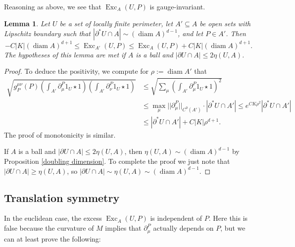 \documentclass[reqno,10pt]{amsart}
\DeclareMathOperator{\diam}{diam}
\DeclareMathOperator{\Exc}{Exc}
\newtheorem{lemma}[theorem]{Lemma}
\theoremstyle{definition}
\numberwithin{equation}{section}
\begin{document}
Reasoning as above, we see that $\Exc_A(U, P)$ is gauge-invariant.

\begin{lemma}
Let $U$ be a set of locally finite perimeter, let $A' \subseteq A$ be open sets with Lipschitz boundary such that $|\partial^* U \cap A| \sim (\diam A)^{d - 1}$,
and let $P \in A'$. Then
\begin{equation}\label{approximate monotone}
-C |K| (\diam A)^{d + 1} \leq \Exc_{A'}(U, P) \leq \Exc_A(U, P) + C |K|(\diam A)^{d + 1}.
\end{equation}
The hypotheses of this lemma are met if $A$ is a ball and $|\partial U \cap A| \leq 2\eta(U, A)$.
\end{lemma}
\begin{proof}
To deduce the positivity, we compute for $\rho := \diam A'$ that
\begin{align*}
\sqrt{g^{\mu\nu}_P(P) \left(\int_{A'} \partial^P_\mu 1_U \star 1\right) \left(\int_{A'} \partial^P_\nu 1_U \star 1\right)} &\leq \sqrt{\sum_\mu \left(\int_{A'} \partial_\mu^P 1_U \star 1\right)^2} \\
 & \leq \max_\mu ||\partial^P_\mu||_{C^0(A')} \cdot |\partial^* U \cap A'| \leq e^{CK\rho^2} |\partial^* U \cap A'| \\
 & \leq |\partial^* U \cap A'| + C|K|\rho^{d + 1}.
\end{align*}
The proof of monotonicity is similar.

If $A$ is a ball and $|\partial U \cap A| \leq 2\eta(U, A)$, then $\eta(U, A) \sim (\diam A)^{d - 1}$ by Proposition \ref{doubling dimension}.
To complete the proof we just note that $|\partial U \cap A| \geq \eta(U, A)$, so $|\partial U \cap A| \sim \eta(U, A) \sim (\diam A)^{d - 1}$.
\end{proof}

\subsection{Translation symmetry}
In the euclidean case, the excess $\Exc_A(U, P)$ is independent of $P$.
Here this is false because the curvature of $M$ implies that $\partial_\mu^P$ actually depends on $P$, but we can at least prove the following:
\end{document}

